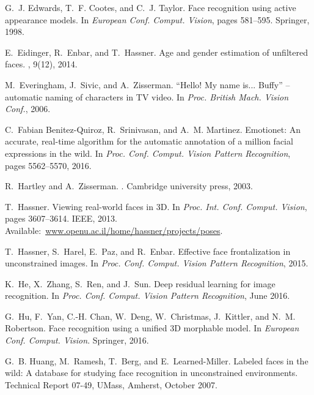 \documentclass[a4paper, 10pt, conference]{ieeeconf}
\begin{document}
\begin{thebibliography}{10}
G.~J. Edwards, T.~F. Cootes, and C.~J. Taylor.
\newblock Face recognition using active appearance models.
\newblock In {\em European Conf. Comput. Vision}, pages 581--595. Springer,
  1998.

E.~Eidinger, R.~Enbar, and T.~Hassner.
\newblock Age and gender estimation of unfiltered faces.
, 9(12), 2014.

M.~Everingham, J.~Sivic, and A.~Zisserman.
\newblock ``{H}ello! {M}y name is... {Buffy}'' -- automatic naming of
  characters in {TV} video.
\newblock In {\em Proc. British Mach. Vision Conf.}, 2006.

C.~Fabian Benitez-Quiroz, R.~Srinivasan, and A.~M. Martinez.
\newblock Emotionet: An accurate, real-time algorithm for the automatic
  annotation of a million facial expressions in the wild.
\newblock In {\em Proc. Conf. Comput. Vision Pattern Recognition}, pages
  5562--5570, 2016.

R.~Hartley and A.~Zisserman.
.
\newblock Cambridge university press, 2003.

T.~Hassner.
\newblock Viewing real-world faces in {3D}.
\newblock In {\em Proc. Int. Conf. Comput. Vision}, pages 3607--3614. IEEE,
  2013.
\newblock Available:~\url{www.openu.ac.il/home/hassner/projects/poses}.

T.~Hassner, S.~Harel, E.~Paz, and R.~Enbar.
\newblock Effective face frontalization in unconstrained images.
\newblock In {\em Proc. Conf. Comput. Vision Pattern Recognition}, 2015.

K.~He, X.~Zhang, S.~Ren, and J.~Sun.
\newblock Deep residual learning for image recognition.
\newblock In {\em Proc. Conf. Comput. Vision Pattern Recognition}, June 2016.

G.~Hu, F.~Yan, C.-H. Chan, W.~Deng, W.~Christmas, J.~Kittler, and N.~M.
  Robertson.
\newblock Face recognition using a unified {3D} morphable model.
\newblock In {\em European Conf. Comput. Vision}. Springer, 2016.

G.~B. Huang, M.~Ramesh, T.~Berg, and E.~Learned-Miller.
\newblock Labeled faces in the wild: A database for studying face recognition
  in unconstrained environments.
\newblock Technical Report 07-49, UMass, Amherst, October 2007.


\end{thebibliography}
\end{document}
